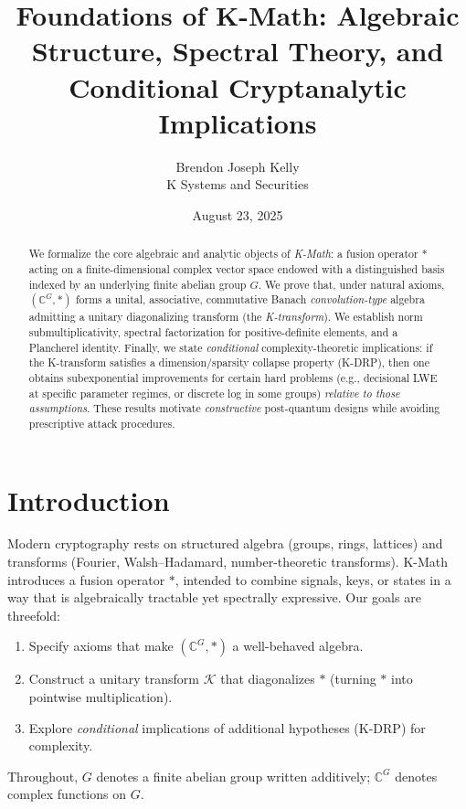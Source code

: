 \documentclass[11pt]{article}
\title{Foundations of K-Math: Algebraic Structure, Spectral Theory, and Conditional Cryptanalytic Implications}
\author{Brendon Joseph Kelly \\ K Systems and Securities}
\date{August 23, 2025}
\theoremstyle{plain}
\theoremstyle{definition}
\theoremstyle{remark}
\begin{document}
\maketitle
\begin{abstract}
We formalize the core algebraic and analytic objects of \emph{K-Math}: a fusion operator $\ast$ acting on a finite-dimensional complex vector space endowed with a distinguished basis indexed by an underlying finite abelian group $G$. We prove that, under natural axioms, $(\mathbb{C}^G, \ast)$ forms a unital, associative, commutative Banach \emph{convolution-type} algebra admitting a unitary diagonalizing transform (the \emph{K-transform}). We establish norm submultiplicativity, spectral factorization for positive-definite elements, and a Plancherel identity. Finally, we state \emph{conditional} complexity-theoretic implications: if the K-transform satisfies a dimension/sparsity collapse property (K-DRP), then one obtains subexponential improvements for certain hard problems (e.g., decisional LWE at specific parameter regimes, or discrete log in some groups) \emph{relative to those assumptions}. These results motivate \emph{constructive} post-quantum designs while avoiding prescriptive attack procedures.
\end{abstract}
\section{Introduction}
Modern cryptography rests on structured algebra (groups, rings, lattices) and transforms (Fourier, Walsh--Hadamard, number-theoretic transforms). K-Math introduces a fusion operator $\ast$, intended to combine signals, keys, or states in a way that is algebraically tractable yet spectrally expressive. Our goals are threefold:
\begin{enumerate}
    \item Specify axioms that make $(\mathbb{C}^G, \ast)$ a well-behaved algebra.
    \item Construct a unitary transform $\mathcal{K}$ that diagonalizes $\ast$ (turning $\ast$ into pointwise multiplication).
    \item Explore \emph{conditional} implications of additional hypotheses (K-DRP) for complexity.
\end{enumerate}
Throughout, $G$ denotes a finite abelian group written additively; $\mathbb{C}^G$ denotes complex functions on $G$.
\end{document}
